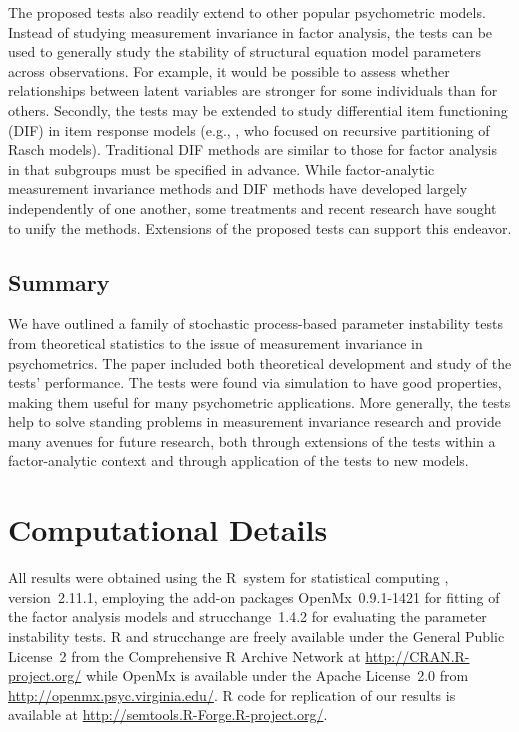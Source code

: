 \documentclass[man]{apa}
\begin{document}
The proposed tests also 
readily extend to other popular psychometric models.  
Instead of studying measurement invariance in factor
analysis, the tests can be used to generally 
study the stability of structural equation model parameters across
observations.  For 
example, it would be possible to assess whether relationships between
latent variables are stronger for some individuals than for
others.  Secondly, 
the tests may be extended to study differential item functioning (DIF)
in item response models (e.g., , who focused on recursive
partitioning of Rasch models).  
Traditional DIF methods are similar to those for factor analysis in
that subgroups must be specified in advance.
While factor-analytic measurement invariance methods and DIF methods
have developed 
largely independently of one another, 
some treatments \cite{Mcd99} and recent research \cite{StaChe06} have
sought to unify the methods.  Extensions of the proposed tests can
support this endeavor.


\subsection{Summary}
We have outlined a family of 
stochastic process-based parameter instability tests from theoretical
statistics to the issue of measurement invariance in psychometrics.
The paper included both theoretical development and 
study of the tests' performance.  The tests were found via simulation
to have good properties, making them useful for many psychometric
applications.  More generally, the tests help to
solve standing problems in
measurement invariance research and provide many avenues for
future research, both through extensions of the tests within a
factor-analytic context and through application of the tests to new
models.

\section*{Computational Details}

All results were obtained using the {R}~system for statistical computing \cite{R2010},
version~2.11.1, employing the add-on packages {OpenMx}~0.9.1-1421 \cite{BokNea11} for
fitting of the factor analysis models and {strucchange}~1.4.2 \cite{ZeiLei02,Zei06}
for evaluating the parameter instability tests. {R} and {strucchange} are
freely available under the General Public License~2 from the
Comprehensive {R} Archive Network at \url{http://CRAN.R-project.org/}
while {OpenMx} is available under the
Apache License~2.0 from \url{http://openmx.psyc.virginia.edu/}.
R code for replication of our results is
available at \url{http://semtools.R-Forge.R-project.org/}.


\end{document}
